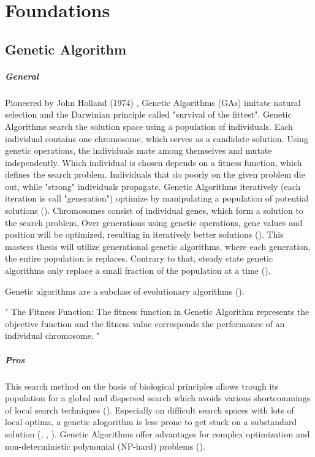 \chapter{Foundations}
\label{chap:foundation}

\section{Genetic Algorithm}
\label{chap:foundation:genetic_algorithm}


\paragraph{General}
Pioneered by John Holland (1974) , Genetic Algorithms (GAs) imitate natural selection and the Darwinian principle called "survival of the fittest". Genetic Algorithms search the solution space using a population of individuals. Each individual contains one chromosome, which serves as a candidate solution. Using genetic operations, the individuals mate among themselves and mutate independently. Which individual is chosen depends on a fitness function, which defines the search problem. Individuals that do poorly on the given problem die out, while "strong" individuals propagate.
Genetic Algorithms iteratively (each iteration is call "generation") optimize by manipulating a population of potential solutions (\cite{srinivas_genetic_1994}).
Chromosomes consist of individual genes, which form a solution to the search problem. Over generations using genetic operations, gene values and position will be optimized, resulting in iteratively better solutions (\cite{srinivas_genetic_1994}).
This masters thesis will utilize generational genetic algorithms, where each generation, the entire population is replaces. Contrary to that, steady state genetic algorithms only replace a small fraction of the population at a time (\cite{srinivas_genetic_1994}).

Genetic algorithms are a subclass of evolutionary algorithms (\cite{mills_determining_2015}).


"
The Fitness Function: The fitness function in Genetic Algorithm represents the objective function and the fitness value corresponds the performance of an individual chromosome.
"\cite{majumdar_genetic_2015}

\paragraph{Pros}
This search method on the basis of biological principles allows trough its population for a global and dispersed search which avoids various shortcommings of local search techniques (\cite{grefenstette_optimization_1986}). Especially on difficult search spaces with lots of local optima, a genetic alogorithm is less prone to get stuck on a substandard solution (\cite{katoch_review_2021}, \cite{xia_genetic_2019}, \cite{majumdar_genetic_2015}). Genetic Algorithms offer advantages for complex optimization and non-deterministic polynomial (NP-hard) problems (\cite{hussain_trade-off_2020}).

